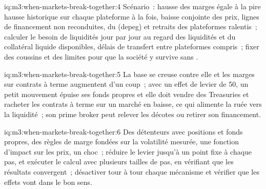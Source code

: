 \begin{solution}{iq:m3:when-markets-break-together:4}
Scénario~: hausse des marges égale à la pire hausse historique sur chaque plateforme à la fois, baisse conjointe des prix, lignes de financement non reconduites,  du  (depeg) et retraits
des plateformes ralentis~; calculer le besoin de liquidités jour par jour au regard des liquidités et du collatéral liquide disponibles, délais de transfert entre plateformes compris~; fixer des coussins
et des limites pour que la société y survive sans .
\end{solution}

\begin{solution}{iq:m3:when-markets-break-together:5}
La base se creuse contre elle et les marges sur contrats à terme augmentent d'un coup~; avec un effet de levier de 50, un petit mouvement épuise ses fonds propres et elle doit vendre des Treasuries et racheter
les contrats à terme sur un marché en baisse, ce qui alimente la ruée vers la liquidité~; son prime broker peut relever les décotes ou retirer son financement.
\end{solution}

\begin{solution}{iq:m3:when-markets-break-together:6}
Des détenteurs avec positions et fonds propres, des règles de marge fondées sur la volatilité mesurée, une fonction d'impact sur les prix, un choc~; réduire le levier jusqu'à un point fixe à chaque pas, et exécuter
le calcul avec plusieurs tailles de pas, en vérifiant que les résultats convergent~; désactiver tour à tour chaque mécanisme et vérifier que les effets vont dans le bon sens.
\end{solution}
